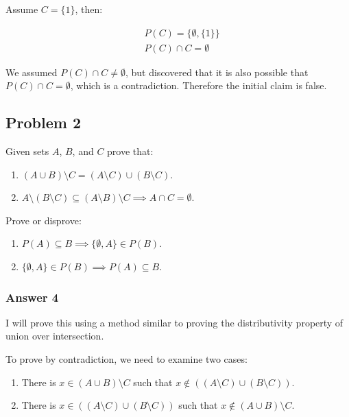\documentclass[11pt]{article}
\begin{document}
Assume $C = \{1\}$, then:

\begin{equation}
\begin{split}
& P(C) = \{\emptyset, \{1\}\} \\
& P(C) \cap C = \emptyset
\end{split}
\end{equation}

We assumed $P(C) \cap C \neq \emptyset$, but discovered that it is also
possible that $P(C) \cap C = \emptyset$, which is a contradiction.
Therefore the initial claim is false.

\subsection{Problem 2}
\label{sec-1-2}
Given sets $A$, $B$, and $C$ prove that:

\begin{enumerate}
\item $(A \cup B) \setminus C = (A \setminus C) \cup (B \setminus C)$.
\item $A \setminus (B \setminus C) \subseteq (A \setminus B) \setminus C \implies A \cap C = \emptyset$.
\end{enumerate}

Prove or disprove:

\begin{enumerate}
\item $P(A) \subseteq B \implies \{\emptyset, A\} \in P(B)$.
\item $\{\emptyset, A\} \in P(B) \implies P(A) \subseteq B$.
\end{enumerate}

\subsubsection{Answer 4}
\label{sec-1-2-1}
I will prove this using a method similar to proving the distributivity property of
union over intersection.

To prove by contradiction, we need to examine two cases:

\begin{enumerate}
\item There is $x \in (A \cup B) \setminus C$ such that 
       $x \not \in ((A \setminus C) \cup (B \setminus C))$.
\item There is $x \in ((A \setminus C) \cup (B \setminus C))$ such that
       $x \not \in (A \cup B) \setminus C$.
\end{enumerate}
\end{document}
